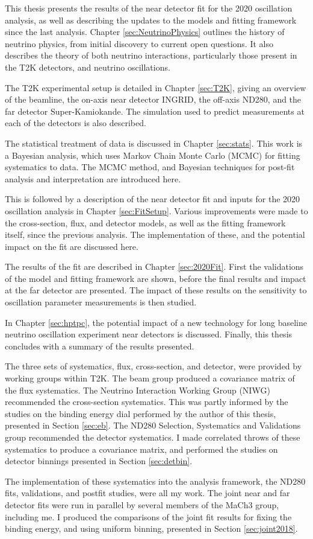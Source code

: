 This thesis presents the results of the near detector fit for the 2020 oscillation analysis, as well as describing the updates to the models and fitting framework since the last analysis. Chapter \ref{sec:NeutrinoPhysics} outlines the history of neutrino physics, from initial discovery to current open questions. It also describes the theory of both neutrino interactions, particularly those present in the T2K detectors, and neutrino oscillations.

The T2K experimental setup is detailed in Chapter \ref{sec:T2K}, giving an overview of the beamline, the on-axis near detector INGRID, the off-axis ND280, and the far detector Super-Kamiokande. The simulation used to predict measurements at each of the detectors is also described.

The statistical treatment of data is discussed in Chapter \ref{sec:stats}. This work is a Bayesian analysis, which uses Markov Chain Monte Carlo (MCMC) for fitting systematics to data. The MCMC method, and Bayesian techniques for post-fit analysis and interpretation are introduced here.

This is followed by a description of the near detector fit and inputs for the 2020 oscillation analysis in Chapter \ref{sec:FitSetup}. Various improvements were made to the cross-section, flux, and detector models, as well as the fitting framework itself, since the previous analysis. The implementation of these, and the potential impact on the fit are discussed here.

The results of the fit are described in Chapter \ref{sec:2020Fit}. First the validations of the model and fitting framework are shown, before the final results and impact at the far detector are presented. The impact of these results on the sensitivity to oscillation parameter measurements is then studied.

In Chapter \ref{sec:hptpc}, the potential impact of a new technology for long baseline neutrino oscillation experiment near detectors is discussed. Finally, this thesis concludes with a summary of the results presented.

The three sets of systematics, flux, cross-section, and detector, were provided by working groups within T2K. The beam group produced a covariance matrix of the flux systematics. The Neutrino Interaction Working Group (NIWG) recommended the cross-section systematics. This was partly informed by the studies on the binding energy dial performed by the author of this thesis, presented in Section \ref{sec:eb}. The ND280 Selection, Systematics and Validations group recommended the detector systematics. I made correlated throws of these systematics to produce a covariance matrix, and performed the studies on detector binnings presented in Section \ref{sec:detbin}.

The implementation of these systematics into the analysis framework, the ND280 fits, validations, and postfit studies, were all my work. The joint near and far detector fits were run in parallel by several members of the MaCh3 group, including me. I produced the comparisons of the joint fit results for fixing the binding energy, and using uniform binning, presented in Section \ref{sec:joint2018}.

\newpage